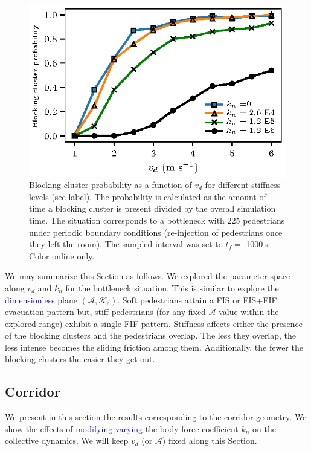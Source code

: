 \documentclass[preprint,12pt]{elsarticle}
\begin{document}
\begin{figure}[htbp!]
\centering
\includegraphics[width=0.7\columnwidth]
{./pbc_vs_vd_multi_kn.eps}
\caption{\label{pbc_vs_vd_multi_kn} Blocking cluster probability as a function of $v_d$ for different stiffness levels (see label). The probability is calculated as the amount of time a blocking cluster is present divided by the overall simulation time. The situation corresponds to a bottleneck with 225 pedestrians under periodic boundary conditions (re-injection of pedestrians once they left the room). The sampled interval was set to $t_f =$ 1000$\,$s. Color online only. }
\end{figure}

We may summarize this Section as follows. We explored the parameter space along $v_d$ and $k_n$ for the bottleneck situation. This is similar to explore the \textcolor{blue}{dimensionless} plane $(\mathcal{A},\mathcal{K}_c)$. Soft pedestrians attain a FIS or FIS+FIF evacuation pattern but, stiff pedestrians (for any fixed $\mathcal{A}$ value within the explored range) exhibit a single FIF pattern. Stiffness affects either the presence of the blocking clusters and the pedestrians overlap. The less they overlap, the less intense becomes the sliding friction among them. Additionally, the fewer the blocking clusters the easier they get out. \\



\subsection{\label{corridor} Corridor}

We present in this section the results corresponding to the corridor geometry. 
We show the effects of \textcolor{blue}{\sout{modifying} varying} the body force coefficient $k_n$ on the 
collective dynamics. We will keep $v_d$ (or $\mathcal{A}$) 
fixed along this Section. \\
\end{document}

